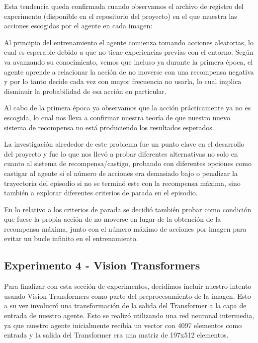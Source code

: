 Esta tendencia queda confirmada cuando observamos el archivo de registro del experimento (disponible en el repositorio del proyecto) en el que muestra las acciones escogidas por el agente en cada imagen:



Al principio del entrenamiento el agente comienza tomando acciones aleatorias, lo cual es esperable debido a que no tiene experiencias previas con el entorno. Según va avanzando su conocimiento, vemos que incluso ya durante la primera época, el agente aprende a relacionar la acción de no moverse con una recompensa negativa y por lo tanto decide cada vez con mayor frecuencia no usarla, lo cual implica disminuir la probabilidad de esa acción en particular.
\medskip

Al cabo de la primera época ya observamos que la acción prácticamente ya no es escogida, lo cual nos lleva a confirmar nuestra teoría de que nuestro nuevo sistema de recompensa no está produciendo los resultados esperados.
\medskip

La investigación alrededor de este problema fue un punto clave en el desarrollo del proyecto y fue lo que nos llevó a probar diferentes alternativas no solo en cuanto al sistema de recompensa/castigo, probando con diferentes opciones como castigar al agente si el número de acciones era demasiado bajo o penalizar la trayectoria del episodio si no se terminó este con la recompensa máxima, sino también a explorar diferentes criterios de parada en el episodio.
\medskip

En lo relativo a los criterios de parada se decidió también probar como condición que fuese la propia acción de no moverse en lugar de la obtención de la recompensa máxima, junto con el número máximo de acciones por imagen para evitar un bucle infinito en el entrenamiento.
\medskip


\subsection{Experimento 4 - Vision Transformers}
\label{resultados-actor-critic-vision-transformers}

Para finalizar con esta sección de experimentos, decidimos incluir nuestro intento usando Vision Transformers como parte del preprocesamiento de la imagen. Esto a su vez involucró una transformación de la salida del Transformer a la capa de entrada de nuestro agente. Esto se realizó utilizando una red neuronal intermedia, ya que nuestro agente inicialmente recibía un vector con 4097 elementos como entrada y la salida del Transformer era una matriz de 197x512 elementos.
\medskip

